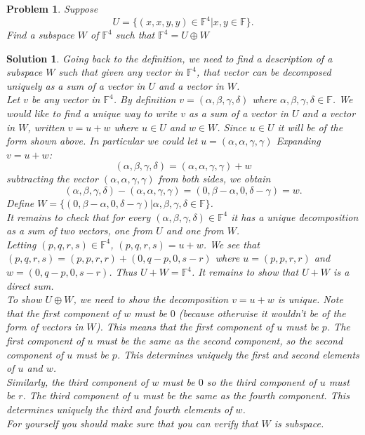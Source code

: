\documentclass{article}
\theoremstyle{problemstyle}
\newtheorem{problem}{Problem}
\theoremstyle{problemstyle}
\newtheorem{solution}{Solution}
\begin{document}
\begin{problem}
Suppose $$U = \{(x,x,y,y) \in \mathbb{F}^4 | x,y \in \mathbb{F}\}.$$ Find a subspace $W$ of $\mathbb{F}^4$ such that $\mathbb{F}^4 = U \oplus W$
\end{problem}

\begin{solution}


Going back to the definition, we need to find a description of a subspace $W$ such that given any vector in $\mathbb{F}^4$, that vector can be decomposed uniquely as a sum of a vector in $U$ and a vector in $W$.\\ 

Let $v$ be any vector in $\mathbb{F}^4$. By definition $v = (\alpha,\beta,\gamma,\delta)$ where  $\alpha,\beta,\gamma,\delta \in \mathbb{F}$. We would like to find a unique way to write $v$ as a sum of a vector in $U$ and a vector in $W$, written $v = u + w$ where $u \in U$ and $w \in W$. Since $u \in U$ it will be of the form shown above. In particular we could let $u =(\alpha,\alpha,\gamma,\gamma)$  Expanding $v = u + w$:
$$(\alpha,\beta,\gamma,\delta) = (\alpha,\alpha,\gamma,\gamma) + w$$ subtracting the vector $(\alpha,\alpha,\gamma,\gamma)$ from both sides, we obtain 
$$(\alpha,\beta,\gamma,\delta) - (\alpha,\alpha,\gamma,\gamma) =  (0,\beta-\alpha,0,\delta-\gamma) = w.$$  Define $W = \{(0,\beta-\alpha,0,\delta-\gamma)|\alpha,\beta,\gamma,\delta \in \mathbb{F}\}$.\\

It remains to check that for every $(\alpha,\beta,\gamma,\delta) \in \mathbb{F}^4$ it has a unique decomposition as a sum of two vectors, one from $U$ and one from $W$.\\

Letting $(p,q,r,s) \in \mathbb{F}^4$, $(p,q,r,s)  = u + w$. We see that $(p,q,r,s) = (p,p,r,r)+(0,q-p,0,s-r)$ where $u = (p,p,r,r)$ and $w = (0,q-p,0,s-r)$. Thus $U+W = \mathbb{F}^4$. It remains to show that $U+W$ is a direct sum.\\

To show $U \oplus W$, we need to show the decomposition $v = u + w$ is unique. Note that the first component of $w$ must be $0$ (because otherwise it wouldn't be of the form of vectors in $W$). This means that the first component of $u$ must be $p$. The first component of $u$ must be the same as the second component, so the second component of $u$ must be $p$. This determines uniquely the first and second elements of $u$ and $w$.\\

Similarly, the third component of $w$ must be $0$ so the third component of $u$ must be $r$. The third component of $u$ must be the same as the fourth component. This determines uniquely the third and fourth elements of $w$.\\   

For yourself you should make sure that you can verify that $W$ is subspace. 
\end{solution}
\end{document}

